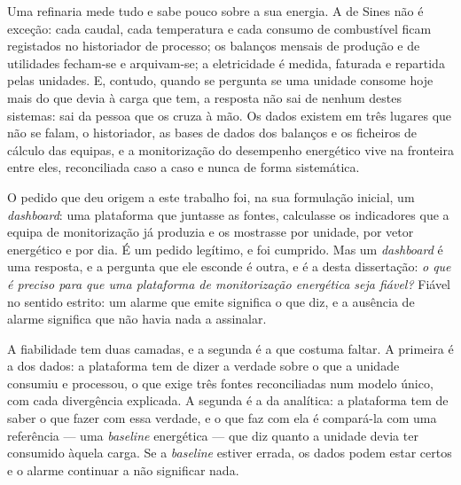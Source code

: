 Uma refinaria mede tudo e sabe pouco sobre a sua energia. A de Sines
não é exceção: cada caudal, cada temperatura e cada consumo de
combustível ficam registados no historiador de processo; os balanços
mensais de produção e de utilidades fecham-se e arquivam-se; a
eletricidade é medida, faturada e repartida pelas unidades. E, contudo,
quando se pergunta se uma unidade consome hoje mais do que devia à carga
que tem, a resposta não sai de nenhum destes sistemas: sai da pessoa que
os cruza à mão.
Os dados existem em três lugares que não se falam, o
historiador, as bases de dados dos balanços e os ficheiros de cálculo
das equipas, e a monitorização do desempenho energético vive na
fronteira entre eles, reconciliada caso a caso e nunca de forma
sistemática.

O pedido que deu origem a este trabalho foi, na sua formulação inicial,
um \emph{dashboard}: uma plataforma que juntasse as fontes, calculasse
os indicadores que a equipa de monitorização já produzia e os mostrasse
por unidade, por vetor energético e por dia. É um pedido legítimo, e foi
cumprido. Mas um \emph{dashboard} é uma resposta, e a pergunta que ele
esconde é outra, e é a desta dissertação: \emph{o que é preciso para que
uma plataforma de monitorização energética seja fiável?} Fiável no
sentido estrito: um alarme que emite significa o que diz, e a ausência
de alarme significa que não havia nada a assinalar.

A fiabilidade tem duas camadas, e a segunda é a que costuma faltar. A
primeira é a dos dados: a plataforma tem de dizer a verdade sobre o que
a unidade consumiu e processou, o que exige três fontes reconciliadas
num modelo único, com cada divergência explicada. A segunda é a da
analítica: a plataforma tem de saber o que fazer com essa verdade, e o
que faz com ela é compará-la com uma referência --- uma \emph{baseline}
energética --- que diz quanto a unidade devia ter consumido àquela
carga. Se a \emph{baseline} estiver errada, os dados podem estar certos
e o alarme continuar a não significar nada.

